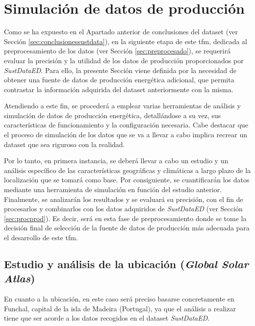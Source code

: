 \section{Simulación de datos de producción}
\label{sec:simuprod}

Como se ha expuesto en el Apartado anterior de conclusiones del dataset (ver Sección \ref{sec:conclusionessustdata}), en la siguiente etapa de este \gls{tfm}, dedicada al preprocesamiento de los datos (ver Sección \ref{sec:preprocesado}), se requerirá evaluar la precisión y la utilidad de los datos de producción proporcionados por \textit{SustDataED}. Para ello, la presente Sección viene definida por la necesidad de obtener una fuente de datos de producción energética adicional, que permita contrastar la información adquirida del dataset anteriormente con la misma.

\vspace{3mm}

Atendiendo a este fin, se procederá a emplear varias herramientas de análisis y simulación de datos de producción energética, detallándose a su vez, sus características de funcionamiento y la configuración necesaria. Cabe destacar que el proceso de simulación de los datos que se va a llevar a cabo implica recrear un dataset que sea riguroso con la realidad.

\vspace{3mm}

Por lo tanto, en primera instancia, se deberá llevar a cabo un estudio y un análisis específico de las características geográficas y climáticas a largo plazo de la localización que se tomará como base. Por consiguiente, se cuantificarán los datos mediante una herramienta de simulación en función del estudio anterior. Finalmente, se analizarán los resultados y se evaluará su precisión, con el fin de procesarlos y combinarlos con los datos adquiridos de \textit{SustDataED} (ver Sección \ref{sec:procprod}). Es decir, será en esta fase de preprocesamiento donde se tome la decisión final de selección de la fuente de datos de producción más adecuada para el desarrollo de este \gls{tfm}.

\subsection{Estudio y análisis de la ubicación (\textit{Global Solar Atlas})}
\label{sec:global}

En cuanto a la ubicación, en este caso será preciso basarse concretamente en Funchal, capital de la isla de Madeira (Portugal), ya que el análisis a realizar tiene que ser acorde a los datos recogidos en el dataset \textit{SustDataED}. 

